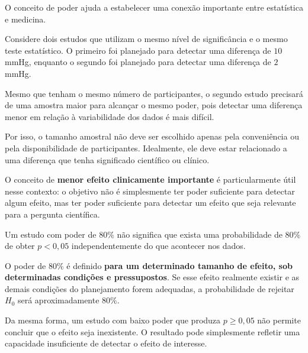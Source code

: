 \begin{deepdive}

O conceito de poder ajuda a estabelecer uma conexão importante entre
estatística e medicina.

Considere dois estudos que utilizam o mesmo nível de significância e o mesmo
teste estatístico. O primeiro foi planejado para detectar uma diferença de
$10$ mmHg, enquanto o segundo foi planejado para detectar uma diferença de
$2$ mmHg.

Mesmo que tenham o mesmo número de participantes, o segundo estudo precisará
de uma amostra maior para alcançar o mesmo poder, pois detectar uma diferença
menor em relação à variabilidade dos dados é mais difícil.

Por isso, o tamanho amostral não deve ser escolhido apenas pela conveniência
ou pela disponibilidade de participantes. Idealmente, ele deve estar
relacionado a uma diferença que tenha significado científico ou clínico.

O conceito de \textbf{menor efeito clinicamente importante} é particularmente
útil nesse contexto: o objetivo não é simplesmente ter poder suficiente para
detectar algum efeito, mas ter poder suficiente para detectar um efeito que
seja relevante para a pergunta científica.
\end{deepdive}

\begin{error}
Um estudo com poder de $80\%$ não significa que exista uma probabilidade de
$80\%$ de obter $p<0{,}05$ independentemente do que acontecer nos dados.

O poder de $80\%$ é definido \textbf{para um determinado tamanho de efeito,
sob determinadas condições e pressupostos}. Se esse efeito realmente existir
e as demais condições do planejamento forem adequadas, a probabilidade de
rejeitar $H_0$ será aproximadamente $80\%$.

Da mesma forma, um estudo com baixo poder que produza $p\geq0{,}05$ não
permite concluir que o efeito seja inexistente. O resultado pode simplesmente
refletir uma capacidade insuficiente de detectar o efeito de interesse.
\end{error}

